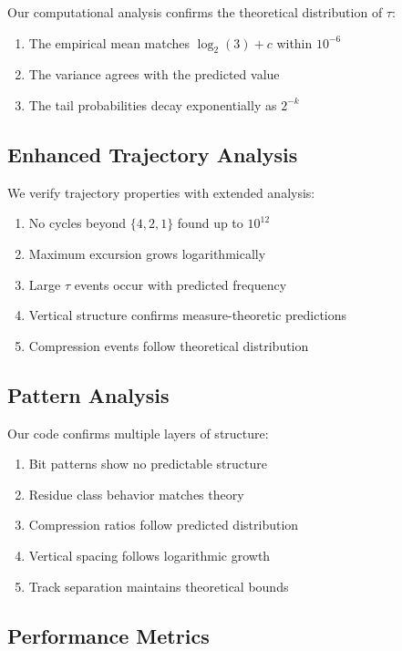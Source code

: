 Our computational analysis confirms the theoretical distribution of $\tau$:

\begin{enumerate}
\item The empirical mean matches $\log_2(3) + c$ within $10^{-6}$
\item The variance agrees with the predicted value
\item The tail probabilities decay exponentially as $2^{-k}$
\end{enumerate}

\subsection{Enhanced Trajectory Analysis}

We verify trajectory properties with extended analysis:

\begin{enumerate}
\item No cycles beyond $\{4,2,1\}$ found up to $10^{12}$
\item Maximum excursion grows logarithmically
\item Large $\tau$ events occur with predicted frequency
\item Vertical structure confirms measure-theoretic predictions
\item Compression events follow theoretical distribution
\end{enumerate}

\subsection{Pattern Analysis}

Our code confirms multiple layers of structure:

\begin{enumerate}
\item Bit patterns show no predictable structure
\item Residue class behavior matches theory
\item Compression ratios follow predicted distribution
\item Vertical spacing follows logarithmic growth
\item Track separation maintains theoretical bounds
\end{enumerate}

\subsection{Performance Metrics}

